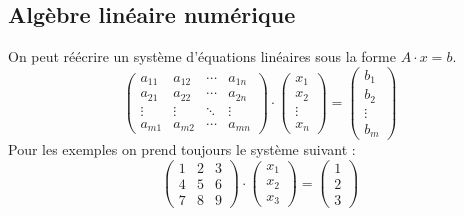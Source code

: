 \subsection*{Algèbre linéaire numérique}
\noindent
On peut réécrire un système d'équations linéaires sous la forme $A\cdot x=b$.
\begin{equation}
    \begin{pmatrix}
        a_{11} & a_{12} & \cdots & a_{1n} \\
        a_{21} & a_{22} & \cdots & a_{2n} \\
        \vdots & \vdots & \ddots & \vdots \\
        a_{m1} & a_{m2} & \cdots & a_{mn}
    \end{pmatrix}
    \cdot
    \begin{pmatrix}
        x_1    \\
        x_2    \\
        \vdots \\
        x_n
    \end{pmatrix}
    =
    \begin{pmatrix}
        b_1    \\
        b_2    \\
        \vdots \\
        b_m
    \end{pmatrix}
    \nonumber
\end{equation}
Pour les exemples on prend toujours le système suivant :
\begin{equation}
    \begin{pmatrix}
        1 & 2 & 3 \\
        4 & 5 & 6 \\
        7 & 8 & 9
    \end{pmatrix}
    \cdot
    \begin{pmatrix}
        x_1 \\
        x_2 \\
        x_3
    \end{pmatrix}
    =
    \begin{pmatrix}
        1 \\
        2 \\
        3
    \end{pmatrix}
    \nonumber
\end{equation}
